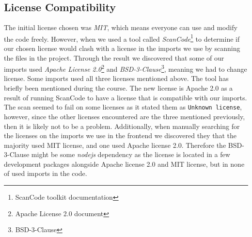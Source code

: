 \subsection{License Compatibility}
\label{subsec:license_compatability}
The initial license chosen was \textit{MIT}, which means everyone can use and modify the code freely.
However, when we used a tool called \textit{ScanCode}\footnote{ScanCode toolkit documentation\cite{Scancode}} to determine if our chosen license would clash with a license in the imports we use by scanning the files in the project. Through the result we discovered that some of our imports used \textit{Apache License 2.0}\footnote{Apache License 2.0 document\cite{Apache2.0}} and \textit{BSD-3-Clause}\footnote{BSD-3-Clause\cite{BSD3Clause}}, meaning we had to change license. Some imports used all three licenses mentioned above. The tool has briefly been mentioned during the course.
The new license is Apache 2.0 as a result of running ScanCode to have a license that is compatible with our imports. The scan seemed to fail on some licenses as it stated them as \texttt{Unknown license}, however, since the other licenses encountered are the three mentioned previously, then it is likely not to be a problem. Additionally, when manually searching for the licenses on the imports we use in the frontend we discovered they that the majority used MIT license, and one used Apache license 2.0. Therefore the BSD-3-Clause might be some \textit{nodejs} dependency as the license is located in a few development packages alongside Apache license 2.0 and MIT license, but in none of used imports in the code.



